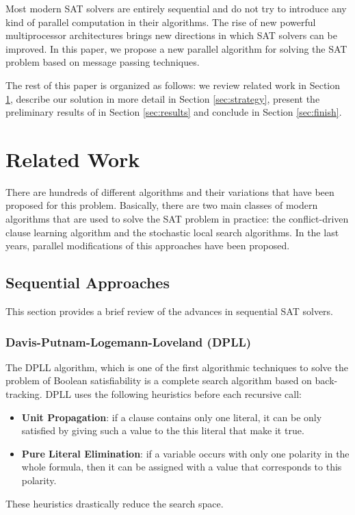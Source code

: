 \documentclass[letterpaper, compsoc, conference]{IEEEtran}
\begin{document}
Most modern SAT solvers are entirely sequential and do not try to introduce any
kind of parallel computation in their algorithms. The rise of new powerful
multiprocessor architectures brings new directions in which SAT solvers can be
improved. In this paper, we propose a new parallel algorithm for solving the
SAT problem based on message passing techniques.

The rest of this paper is organized as follows: we review related work in
Section \ref{sec:related}, describe our solution in more detail in Section
\ref{sec:strategy}, present the preliminary results of in Section
\ref{sec:results} and conclude in Section \ref{sec:finish}.

\section{Related Work}
\label{sec:related}

There are hundreds of different algorithms and their variations that have been
proposed for this problem. Basically, there are two main classes of modern
algorithms that are used to solve the SAT problem in practice: the
conflict-driven clause learning algorithm and the stochastic local search
algorithms. In the last years, parallel modifications of this approaches have
been proposed.

\subsection{Sequential Approaches}

This section provides a brief review of the advances in sequential SAT solvers.

\subsubsection{Davis-Putnam-Logemann-Loveland (DPLL)}

The DPLL algorithm, which is one of the first algorithmic techniques to solve
the problem of Boolean satisfiability is a complete search algorithm based on
back-tracking. DPLL uses the following heuristics before each recursive call:

\begin{itemize}
\item \textbf{Unit Propagation}: if a clause contains only one literal, it can
be only satisfied by giving such a value to the this literal that make it true. 

\item \textbf{Pure Literal Elimination}: if a variable occurs with only one
polarity in the whole formula, then it can be assigned with a value that
corresponds to this polarity.
\end{itemize}
These heuristics drastically reduce the search space.
\end{document}
